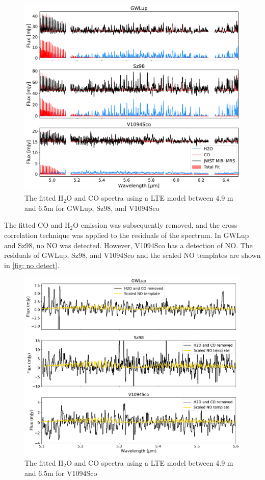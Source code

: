 \documentclass[oneside, single, authoryear, semicolon, 12pt]{lion-msc}
\newcommand{\4}{$_4$}
\newcommand{\3}{$_3$}
\newcommand{\2}{$_2$}
\begin{document}
\begin{figure}[H]
    \centering
    \includegraphics[width=\linewidth]{Figures/Fits.pdf}
    \caption{The fitted H\2O and CO spectra using a LTE model between 4.9 \textmu m and 6.5\textmu m for GWLup, Sz98, and V1094Sco}
    \label{fig: fits}
\end{figure}

The fitted CO and H\2O emission was subsequently removed, and the cross-correlation technique was applied to the residuals of the spectrum. In GWLup and Sz98, no NO was detected. However, V1094Sco has a detection of NO. The residuals of GWLup, Sz98, and V1094Sco and the scaled NO templates are shown in \autoref{fig: no detect}. 
\begin{figure}[H]
    \centering
    \includegraphics[width=\linewidth]{Figures/NO_Detect_stacked.pdf}
    \caption{The fitted H\2O and CO spectra using a LTE model between 4.9 \textmu m and 6.5\textmu m for V1094Sco}
    \label{fig: no detect}
\end{figure}
\end{document}
